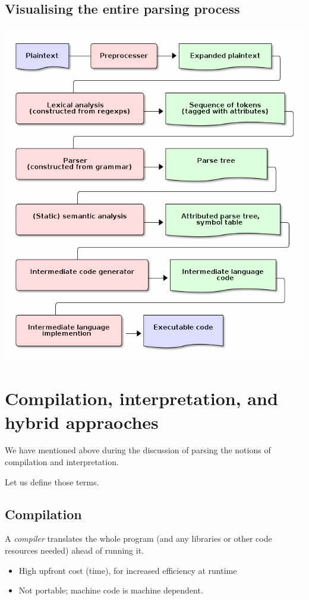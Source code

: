 \documentclass[11pt]{article}
\theoremstyle{definition}
\begin{document}
\subsection{Visualising the entire parsing process}
\label{sec:orgac6abb0}
\begin{center}
\includegraphics[width=\textwidth]{media/parsing-whole.png}
\end{center}

\section{Compilation, interpretation, and hybrid appraoches}
\label{sec:orgf4bc1ae}
We have mentioned above during the discussion of parsing
the notions of compilation and interpretation.

Let us define those terms.

\subsection{Compilation}
\label{sec:orgf94dfeb}
A \emph{compiler} translates the whole program
(and any libraries or other code resources needed)
ahead of running it.
\begin{itemize}
\item High upfront cost (time), for increased efficiency at runtime
\item Not portable; machine code is machine dependent.
\end{itemize}
\end{document}
